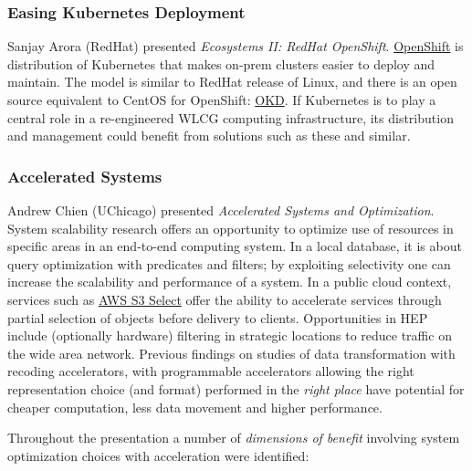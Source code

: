 \documentclass[11pt,letterpaper,fleqn]{article}
\begin{document}
\subsubsection{Easing Kubernetes Deployment}

Sanjay Arora (RedHat) presented {\it Ecosystems II: RedHat OpenShift}.  \href{https://www.openshift.com/}{OpenShift} is distribution of Kubernetes that makes on-prem clusters easier to deploy and maintain.  The model is similar to RedHat release of Linux, and there is an open source equivalent to CentOS for OpenShift: \href{https://www.okd.io/}{OKD}.  If Kubernetes is to play a central role in a re-engineered WLCG computing infrastructure, its distribution and management could benefit from solutions such as these and similar.




\subsubsection{Accelerated Systems}

Andrew Chien (UChicago) presented {\it Accelerated Systems and Optimization}.  System scalability research offers an opportunity to optimize use of resources in specific areas in an end-to-end computing system.   In a local database, it is about query optimization with predicates and filters; by exploiting selectivity one can increase the scalability and performance of a system. In a public cloud context, services such as \href{https://aws.amazon.com/blogs/aws/s3-glacier-select/}{AWS S3 Select} offer the ability to accelerate services through partial selection of objects before delivery to clients.  Opportunities in HEP include (optionally hardware) filtering in strategic locations to reduce traffic on the wide area network.  Previous findings on studies of data transformation with recoding accelerators, with programmable accelerators allowing the right representation choice (and format) performed in the {\it right place} have potential for cheaper computation, less data movement and higher performance.

Throughout the presentation a number of {\it dimensions of benefit} involving system optimization choices with acceleration were identified:
\end{document}
